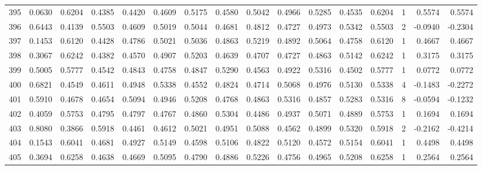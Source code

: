 \begin{tabular}{lrrrrrrrrrrrrrrr}
395 &      0.0630 &  0.6204 &  0.4385 &  0.4420 &  0.4609 &  0.5175 &  0.4580 &  0.5042 &  0.4966 &  0.5285 &   0.4535 &     0.6204 &      1 &                    0.5574 &                     0.5574 \\
396 &      0.6443 &  0.4139 &  0.5503 &  0.4609 &  0.5019 &  0.5044 &  0.4681 &  0.4812 &  0.4727 &  0.4973 &   0.5342 &     0.5503 &      2 &                   -0.0940 &                    -0.2304 \\
397 &      0.1453 &  0.6120 &  0.4428 &  0.4786 &  0.5021 &  0.5036 &  0.4863 &  0.5219 &  0.4892 &  0.5064 &   0.4758 &     0.6120 &      1 &                    0.4667 &                     0.4667 \\
398 &      0.3067 &  0.6242 &  0.4382 &  0.4570 &  0.4907 &  0.5203 &  0.4639 &  0.4707 &  0.4727 &  0.4863 &   0.5142 &     0.6242 &      1 &                    0.3175 &                     0.3175 \\
399 &      0.5005 &  0.5777 &  0.4542 &  0.4843 &  0.4758 &  0.4847 &  0.5290 &  0.4563 &  0.4922 &  0.5316 &   0.4502 &     0.5777 &      1 &                    0.0772 &                     0.0772 \\
400 &      0.6821 &  0.4549 &  0.4611 &  0.4948 &  0.5338 &  0.4552 &  0.4824 &  0.4714 &  0.5068 &  0.4976 &   0.5130 &     0.5338 &      4 &                   -0.1483 &                    -0.2272 \\
401 &      0.5910 &  0.4678 &  0.4654 &  0.5094 &  0.4946 &  0.5208 &  0.4768 &  0.4863 &  0.5316 &  0.4857 &   0.5283 &     0.5316 &      8 &                   -0.0594 &                    -0.1232 \\
402 &      0.4059 &  0.5753 &  0.4795 &  0.4797 &  0.4767 &  0.4860 &  0.5304 &  0.4486 &  0.4937 &  0.5071 &   0.4889 &     0.5753 &      1 &                    0.1694 &                     0.1694 \\
403 &      0.8080 &  0.3866 &  0.5918 &  0.4461 &  0.4612 &  0.5021 &  0.4951 &  0.5088 &  0.4562 &  0.4899 &   0.5320 &     0.5918 &      2 &                   -0.2162 &                    -0.4214 \\
404 &      0.1543 &  0.6041 &  0.4681 &  0.4927 &  0.5149 &  0.4598 &  0.5106 &  0.4822 &  0.5120 &  0.4572 &   0.5154 &     0.6041 &      1 &                    0.4498 &                     0.4498 \\
405 &      0.3694 &  0.6258 &  0.4638 &  0.4669 &  0.5095 &  0.4790 &  0.4886 &  0.5226 &  0.4756 &  0.4965 &   0.5208 &     0.6258 &      1 &                    0.2564 &                     0.2564 \\

\end{tabular}

